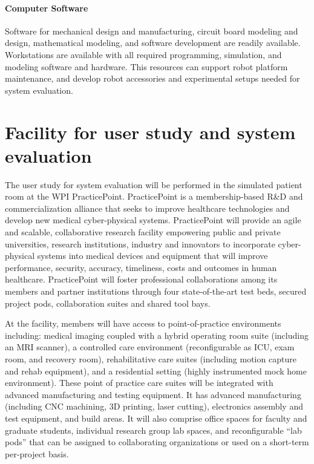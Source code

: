 \paragraph*{Computer Software} 
Software for mechanical design and manufacturing, circuit board modeling and design, mathematical modeling, and software development are readily available. Workstations are available with all required programming, simulation, and modeling software and hardware. This resources can support robot platform maintenance, and develop robot accessories and experimental setups needed for system evaluation.  

\section{Facility for user study and system evaluation}\label{sec:PracticePoint}
The user study for system evaluation will be performed in the simulated patient room at the WPI PracticePoint. PracticePoint is a membership-based R\&D and commercialization alliance that seeks to improve healthcare technologies and develop new medical cyber-physical systems. PracticePoint will provide an agile and scalable, collaborative research facility empowering public and private universities, research institutions, industry and innovators to incorporate cyber-physical systems into medical devices and equipment that will improve performance, security, accuracy, timeliness, costs and outcomes in human healthcare. PracticePoint will foster professional collaborations among its members and partner institutions through four state-of-the-art test beds, secured project pods, collaboration suites and shared tool bays.

At the facility, members will have access to point-of-practice environments including: medical imaging coupled with a hybrid operating room suite (including an MRI scanner), a controlled care environment (reconfigurable as ICU, exam room, and recovery room), rehabilitative care suites (including motion capture and rehab equipment), and a residential setting (highly instrumented mock home environment). These point of practice care suites will be integrated with advanced manufacturing and testing equipment. It has advanced manufacturing (including CNC machining, 3D printing, laser cutting), electronics assembly and test equipment, and build areas. It will also comprise office spaces for faculty and graduate students, individual research group lab spaces, and reconfigurable “lab pods” that can be assigned to collaborating organizations or used on a short-term per-project basis. 

